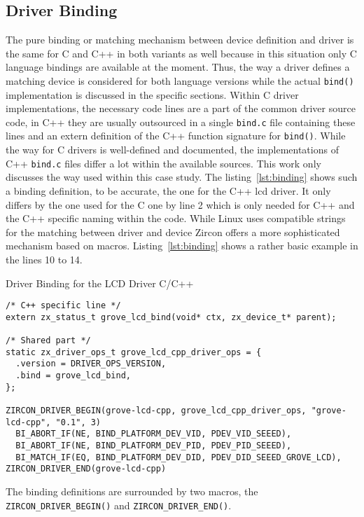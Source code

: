 \subsection{Driver Binding}
The pure binding or matching mechanism between device definition and driver is the same for C and C++ in both variants as well because in this situation only C language bindings are available at the moment.
Thus, the way a driver defines a matching device is considered for both language versions while the actual \texttt{bind()} implementation is discussed in the specific sections.
Within C driver implementations, the necessary code lines are a part of the common driver source code, in C++ they are usually outsourced in a single \texttt{bind.c} file containing these lines and an extern definition of the C++ function signature for \texttt{bind()}.
While the way for C drivers is well-defined and documented, the implementations of C++ \texttt{bind.c} files differ a lot within the available sources.
This work only discusses the way used within this case study.
The listing~\ref{lst:binding} shows such a binding definition, to be accurate, the one for the C++ \ac{lcd} driver.
It only differs by the one used for the C one by line 2 which is only needed for C++ and the C++ specific naming within the code.
While Linux uses compatible strings for the matching between driver and device Zircon offers a more sophisticated mechanism based on macros.
Listing~\ref{lst:binding} shows a rather basic example in the lines 10 to 14.
%
\begin{listing} [H]
\caption{Driver Binding for the LCD Driver C/C++}
\label{lst:binding}
\begin{verbatim}
/* C++ specific line */
extern zx_status_t grove_lcd_bind(void* ctx, zx_device_t* parent);

/* Shared part */
static zx_driver_ops_t grove_lcd_cpp_driver_ops = {
  .version = DRIVER_OPS_VERSION,
  .bind = grove_lcd_bind,
};

ZIRCON_DRIVER_BEGIN(grove-lcd-cpp, grove_lcd_cpp_driver_ops, "grove-lcd-cpp", "0.1", 3)
  BI_ABORT_IF(NE, BIND_PLATFORM_DEV_VID, PDEV_VID_SEEED),
  BI_ABORT_IF(NE, BIND_PLATFORM_DEV_PID, PDEV_PID_SEEED),
  BI_MATCH_IF(EQ, BIND_PLATFORM_DEV_DID, PDEV_DID_SEEED_GROVE_LCD),
ZIRCON_DRIVER_END(grove-lcd-cpp)
\end{verbatim}
\end{listing}
%
The binding definitions are surrounded by two macros, the \texttt{ZIRCON_DRIVER_BEGIN()} and \texttt{ZIRCON_DRIVER_END()}.
